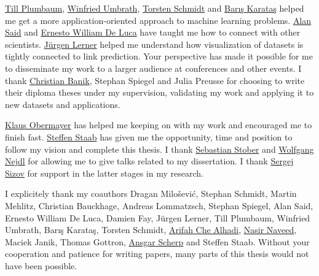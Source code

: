 \documentclass[11pt,a4paper]{book}
\begin{document}
\begin{spacing}{1.3}
\href{http://www.dai-labor.de/team/till.plumbaum}{Till Plumbaum},
\href{https://www.xing.com/profile/Winfried_Umbrath}{Winfried Umbrath},
\href{http://www.dai-labor.de/team/torsten.schmidt}{Torsten Schmidt} and
\href{http://www.dai-labor.de/team/baris.karatas}{Barış Karataş}
helped me get a more application-oriented approach to machine learning
problems. 
\href{http://alansaid.com/}{Alan Said} and
\href{http://ernestodeluca.de/}{Ernesto William De Luca} have 
taught me how to connect with 
other scientists. 
\href{http://www.inf.uni-konstanz.de/~lerner/}{Jürgen Lerner} helped me
understand how visualization of datasets is 
tightly connected to link prediction. 
Your perspective has made it possible for me to disseminate my work to a
larger audience at conferences and other events. 
I thank \href{http://buschaos.de/}{Christian Banik}, Stephan Spiegel and Julia Preusse for choosing
to write their diploma theses under my supervision, validating my work
and applying it to new datasets and applications. 

\href{http://www.ni.tu-berlin.de/menue/members/head_of_research_group/obermayer_klaus/}{Klaus
  Obermayer} has helped me keeping on with my work and encouraged me 
to finish fast. 
\href{http://www.uni-koblenz.de/~staab/}{Steffen Staab} has given me the
opportunity, time and position to follow 
my vision and complete this thesis. 
I thank \href{http://www.findke.ovgu.de/stober.html}{Sebastian Stober}
and \href{http://www.kbs.uni-hannover.de/~nejdl/}{Wolfgang Nejdl} for
allowing me to give  
talks related to my dissertation. 
I thank \href{http://www.uni-koblenz.de/~sizov/}{Sergej Sizov} for
support in the latter stages in my research.  

I explicitely thank my coauthors Dragan Milošević, Stephan Schmidt, Martin
Mehlitz, Christian Bauckhage, Andreas Lommatzsch, Stephan Spiegel, Alan
Said, Ernesto William De Luca, Damien Fay, Jürgen Lerner, Till Plumbaum,
Winfried Umbrath, Barış Karataş, Torsten Schmidt,
\href{http://www.uni-koblenz-landau.de/koblenz/fb4/AGStaab/Persons/Alhadi/arifah-alhadi}{Arifah
  Che Alhadi}, 
\href{http://www.uni-koblenz-landau.de/koblenz/fb4/AGStaab/Persons/Naveed/nasir-naveed}{Nasir
  Naveed}, Maciek Janik, Thomas Gottron, \href{http://ansgarscherp.net/}{Ansgar Scherp} and Steffen 
Staab.  Without your 
cooperation and patience for writing papers, many parts of this thesis
would not have been possible. 


\end{spacing}
\end{document}
